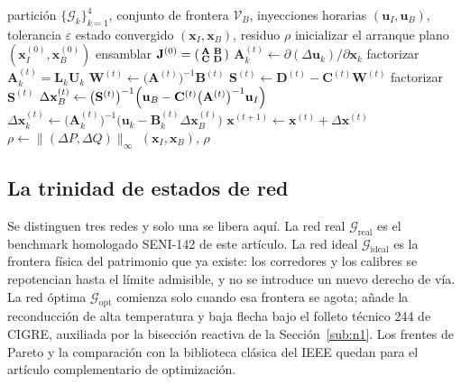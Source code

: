 \begin{algorithm}[!t]
\caption{Flujo de potencia AC de frontera-Schur sobre la partición HBCF del SENI-142}
\label{alg:schur_pf}
\begin{algorithmic}[1]
\Require partición $\{\mathcal{G}_k\}_{k=1}^{4}$, conjunto de frontera $\mathcal{V}_B$,
         inyecciones horarias $(\mathbf{u}_I, \mathbf{u}_B)$, tolerancia $\varepsilon$
\Ensure estado convergido $(\mathbf{x}_I, \mathbf{x}_B)$, residuo $\rho$
\State inicializar el arranque plano $(\mathbf{x}_I^{(0)}, \mathbf{x}_B^{(0)})$
\State ensamblar $\mathbf{J}^{(0)} = \begin{psmallmatrix} \mathbf{A} & \mathbf{B} \\ \mathbf{C} & \mathbf{D} \end{psmallmatrix}$
   
     \State $\mathbf{A}_k^{(t)} \gets \partial (\Delta \mathbf{u}_k) / \partial \mathbf{x}_k$
     \State factorizar $\mathbf{A}_k^{(t)} = \mathbf{L}_k \mathbf{U}_k$ 
  \EndFor
  \State $\mathbf{W}^{(t)} \gets \bigl(\mathbf{A}^{(t)}\bigr)^{-1} \mathbf{B}^{(t)}$ 
  \State $\mathbf{S}^{(t)} \gets \mathbf{D}^{(t)} - \mathbf{C}^{(t)} \mathbf{W}^{(t)}$
  \State factorizar $\mathbf{S}^{(t)}$
  \State $\Delta \mathbf{x}_B^{(t)} \gets \bigl(\mathbf{S}^{(t)}\bigr)^{-1} \Bigl( \mathbf{u}_B - \mathbf{C}^{(t)} \bigl(\mathbf{A}^{(t)}\bigr)^{-1} \mathbf{u}_I \Bigr)$
   
     \State $\Delta \mathbf{x}_k^{(t)} \gets \bigl(\mathbf{A}_k^{(t)}\bigr)^{-1} \bigl( \mathbf{u}_k - \mathbf{B}_k^{(t)} \Delta \mathbf{x}_B^{(t)} \bigr)$
  \EndFor
  \State $\mathbf{x}^{(t+1)} \gets \mathbf{x}^{(t)} + \Delta \mathbf{x}^{(t)}$
  \State $\rho \gets \lVert (\Delta P, \Delta Q) \rVert_{\infty}$
\EndFor
\State \Return $(\mathbf{x}_I, \mathbf{x}_B)$, $\rho$ 
\end{algorithmic}
\end{algorithm}

\subsection{La trinidad de estados de red}
\label{sub:triad}

Se distinguen tres redes y solo una se libera aquí. La red real $\mathcal{G}_{\mathrm{real}}$ es el benchmark homologado SENI-142 de este artículo. La red ideal $\mathcal{G}_{\mathrm{ideal}}$ es la frontera física del patrimonio que ya existe: los corredores y los calibres se repotencian hasta el límite admisible, y no se introduce un nuevo derecho de vía. La red óptima $\mathcal{G}_{\mathrm{opt}}$ comienza solo cuando esa frontera se agota; añade la reconducción de alta temperatura y baja flecha bajo el folleto técnico 244 de CIGRE, auxiliada por la bisección reactiva de la Sección~\ref{sub:n1}. Los frentes de Pareto y la comparación con la biblioteca clásica del IEEE quedan para el artículo complementario de optimización.

